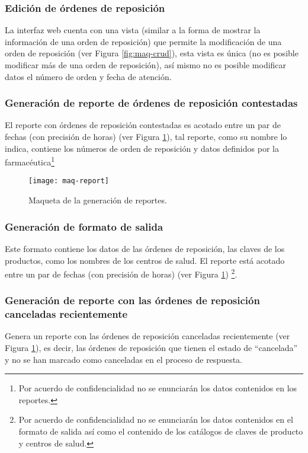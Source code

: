\subsubsection{Edición de órdenes de reposición}\label{req-edicion}
La interfaz web cuenta con una vista (similar a la forma de mostrar la información de una orden de reposición) que permite la modificación de una orden de reposición (ver Figura \ref{fig:maq-crud}), esta vista es única (no es posible modificar más de una orden de reposición), así mismo no es posible modificar datos el número de orden y fecha de atención.

\subsubsection{Generación de reporte de órdenes de reposición contestadas}
El reporte con órdenes de reposición contestadas es acotado entre un par de fechas (con precisión de horas) (ver Figura \ref{fig:maq-report}), tal reporte, como su nombre lo indica, contiene los números de orden de reposición y datos definidos por la farmacéutica\footnote{Por acuerdo de confidencialidad no se enunciarán los datos contenidos en los reportes.}
\begin{figure}[h]
  \centering
  \texttt{[image: maq-report]} 
  \caption{Maqueta de la generación de reportes.}
  \label{fig:maq-report}
\end{figure} 

\subsubsection{Generación de formato de salida}
Este formato contiene los datos de las órdenes de reposición, las claves de los productos, como los nombres de los centros de salud. El reporte está acotado entre un par de fechas (con precisión de horas) (ver Figura \ref{fig:maq-report}) \footnote{Por acuerdo de confidencialidad no se enunciarán los datos contenidos en el formato de salida así como el contenido de los catálogos de claves de producto y centros de salud.}.

\subsubsection{Generación de reporte con las órdenes de reposición canceladas recientemente}
Genera un reporte con las órdenes de reposición canceladas recientemente (ver Figura \ref{fig:maq-report}), es decir, las órdenes de reposición que tienen el estado de “cancelada” y no se han marcado como canceladas en el proceso de respuesta.

